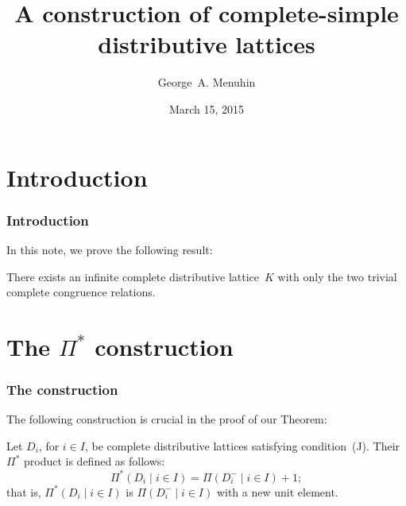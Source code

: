 \documentclass{beamer}
\begin{document}
\title{A construction of complete-simple\\  
       distributive lattices}
\author{George~A. Menuhin}
\date{March 15, 2015}

\maketitle

\section{Introduction}\label{S:intro} 

\begin{frame}
\frametitle{Introduction}

In this note, we prove the following result:

\begin{theorem} 
There exists an infinite complete distributive 
lattice~$K$ with only the two trivial complete 
congruence relations.
\end{theorem}
\end{frame}

\section{The $\Pi^{*}$ construction}\label{S:P*} 

\begin{frame}
\frametitle{The construction}

The following construction is crucial in the proof
of our Theorem:

\begin{definition}\label{D:P*} 
Let $D_{i}$, for $i \in I$, be complete distributive 
lattices satisfying condition~\textup{(J)}.  Their 
$\Pi^{*}$ product is defined as follows:
\[
   \Pi^{*} ( D_{i} \mid i \in I ) = 
   \Pi ( D_{i}^{-} \mid i \in I ) + 1;
\]
that is, $\Pi^{*} ( D_{i} \mid i \in I )$ is 
$\Pi ( D_{i}^{-} \mid i \in I )$ with a new 
unit element. 
\end{definition}
\end{frame}
\end{document}
